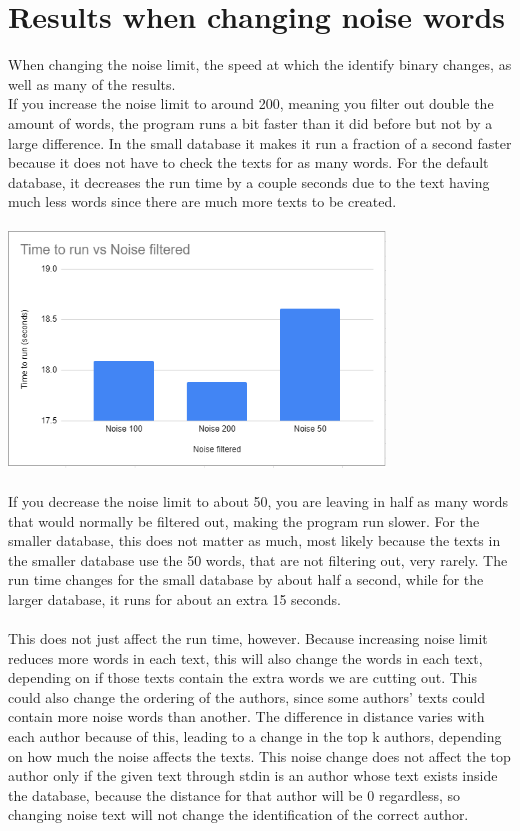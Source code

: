 \documentclass[11pt]{article}
\begin{document}
\section{Results when changing noise words}\label{ss:noise}
When changing the noise limit, the speed at which the identify binary changes, as well as many of the results.\\
If you increase the noise limit to around 200, meaning you filter out double the amount of words, the program runs a bit faster than it did before but not by a large difference. In the small database it makes it run a fraction of a second faster because it does not have to check the texts for as many words. For the default database, it decreases the run time by a couple seconds due to the text having much less words since there are much more texts to be created. 
\\ \\
\includegraphics[width = 0.75\textwidth]{Graphs/Noise.PNG}
\\ \\
If you decrease the noise limit to about 50, you are leaving in half as many words that would normally be filtered out, making the program run slower. For the smaller database, this does not matter as much, most likely because the texts in the smaller database use the 50 words, that are not filtering out, very rarely. The run time changes for the small database by about half a second, while for the larger database, it runs for about an extra 15 seconds.
\\ \\
This does not just affect the run time, however. Because increasing noise limit reduces more words in each text, this will also change the words in each text, depending on if those texts contain the extra words we are cutting out. This could also change the ordering of the authors, since some authors' texts could contain more noise words than another. The difference in distance varies with each author because of this, leading to a change in the top k authors, depending on how much the noise affects the texts. This noise change does not affect the top author only if the given text through stdin is an author whose text exists inside the database, because the distance for that author will be 0 regardless, so changing noise text will not change the identification of the correct author.
\\ \\
\end{document}
